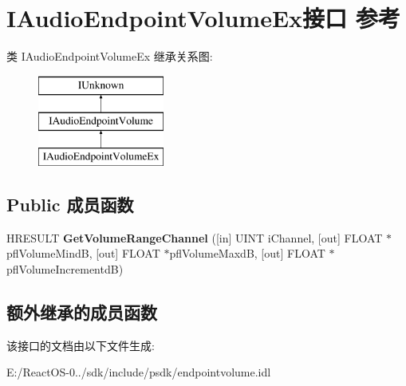 \hypertarget{interface_i_audio_endpoint_volume_ex}{}\section{I\+Audio\+Endpoint\+Volume\+Ex接口 参考}
\label{interface_i_audio_endpoint_volume_ex}
类 I\+Audio\+Endpoint\+Volume\+Ex 继承关系图\+:\begin{figure}[H]
\begin{center}
\leavevmode
\includegraphics[height=3.000000cm]{interface_i_audio_endpoint_volume_ex}
\end{center}
\end{figure}
\subsection*{Public 成员函数}
\begin{DoxyCompactItemize}
\item 
\mbox{\label{interface_i_audio_endpoint_volume_ex_ae163d6e2478dcb0c2053044ff61ca98b}} 
H\+R\+E\+S\+U\+LT {\bfseries Get\+Volume\+Range\+Channel} (\mbox{[}in\mbox{]} U\+I\+NT i\+Channel, \mbox{[}out\mbox{]} F\+L\+O\+AT $\ast$pfl\+Volume\+MindB, \mbox{[}out\mbox{]} F\+L\+O\+AT $\ast$pfl\+Volume\+MaxdB, \mbox{[}out\mbox{]} F\+L\+O\+AT $\ast$pfl\+Volume\+IncrementdB)
\end{DoxyCompactItemize}
\subsection*{额外继承的成员函数}


该接口的文档由以下文件生成\+:\begin{DoxyCompactItemize}
\item 
E\+:/\+React\+O\+S-\/0../sdk/include/psdk/endpointvolume.\+idl\end{DoxyCompactItemize}
